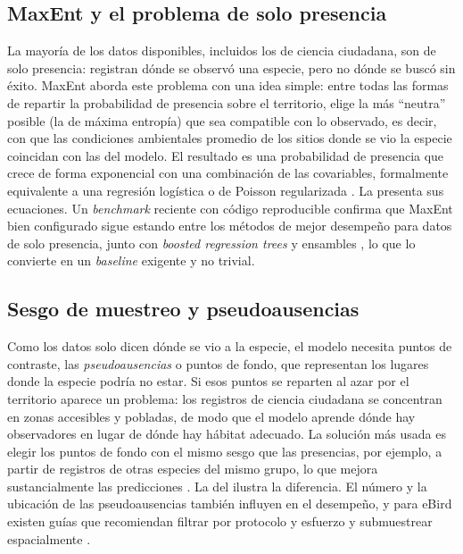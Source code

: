 \subsection*{MaxEnt y el problema de solo presencia}

La mayoría de los datos disponibles, incluidos los de ciencia ciudadana,
son de solo presencia: registran dónde se observó una especie, pero no dónde
se buscó sin éxito. MaxEnt aborda este problema con una idea simple: entre todas las formas de
repartir la probabilidad de presencia sobre el territorio, elige la más
``neutra'' posible (la de máxima entropía) que sea compatible con lo
observado, es decir, con que las condiciones ambientales promedio de los
sitios donde se vio la especie coincidan con las del modelo. El resultado es
una probabilidad de presencia que crece de forma exponencial con una
combinación de las covariables, formalmente equivalente a una regresión
logística o de Poisson regularizada \citep{phillips2006maxent}. La
 presenta sus ecuaciones. Un \textit{benchmark} reciente con
código reproducible confirma que MaxEnt bien configurado sigue estando entre
los métodos de mejor desempeño para datos de solo presencia, junto con
\textit{boosted regression trees} y ensambles \citep{valavi2022benchmark}, lo
que lo convierte en un \textit{baseline} exigente y no trivial.

\subsection*{Sesgo de muestreo y pseudoausencias}

Como los datos solo dicen dónde se vio a la especie, el modelo necesita
puntos de contraste, las \emph{pseudoausencias} o puntos de fondo, que
representan los lugares donde la especie podría no estar. Si esos puntos se
reparten al azar por el territorio aparece un problema: los registros de
ciencia ciudadana se concentran en zonas accesibles y pobladas, de modo que
el modelo aprende dónde hay observadores en lugar de dónde hay hábitat
adecuado. La solución más usada es elegir los puntos de fondo con el mismo
sesgo que las presencias, por ejemplo, a partir de registros de otras
especies del mismo grupo, lo que mejora sustancialmente las predicciones
\citep{phillips2009bias}. La  del
 ilustra la diferencia. El número y la ubicación de las
pseudoausencias también influyen en el desempeño, y para eBird existen guías
que recomiendan filtrar por protocolo y esfuerzo y submuestrear espacialmente
\citep{johnston2021ebird}.

